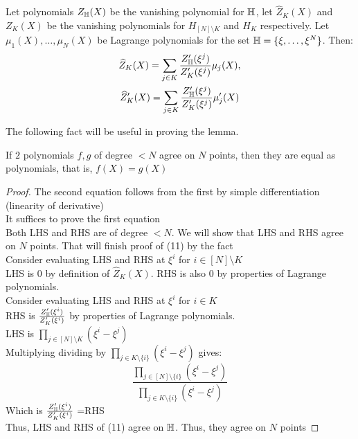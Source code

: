 \begin{lemma}\label{lem:zk-hat}
Let polynomials $Z_{\mathbb{H}}(X)$ be the vanishing polynomial for $\mathbb{H}$, let $\widehat{Z}_K(X)$ and $Z_K(X)$ be the vanishing polynomials for $H_{[N]\setminus K}$ and $H_K$ respectively. Let $\mu_1(X),\ldots,\mu_N(X)$
be Lagrange polynomials for the set $\mathbb{H}=\{\xi,\ldots,\xi^N\}$. Then:
\begin{gather}
    \widehat{Z}_K(X) = \sum_{j\in K}\frac{Z_{\mathbb{H}}'(\xi^j)}{Z_K'(\xi^j)}\mu_j(X), \\
    \widehat{Z}_K'(X)= \sum_{j\in K}\frac{Z_{\mathbb{H}}'(\xi^j)}{Z_K'(\xi^j)}\mu_j'(X)
\end{gather}
\end{lemma}
The following fact will be useful in proving the lemma.
\begin{fact}
    If $2$ polynomials $f,g$ of degree $<N$ agree on $N$ points, then they are equal as polynomials, that is, $f(X)=g(X)$
\end{fact}

\begin{proof}
    The second equation follows from the first by simple differentiation (linearity of derivative)\\
    It suffices to prove the first equation\\
    Both LHS and RHS are of degree $<N$. We will show that LHS and RHS agree on $N$ points. That will finish proof of (11) by the fact\\
    Consider evaluating LHS and RHS at $\xi^i$ for $i \in [N]\setminus K$ \\
    LHS is 0 by definition of $\hat{Z}_K(X)$. RHS is also 0 by properties of Lagrange polynomials.\\
    Consider evaluating LHS and RHS at $\xi^i$ for $i \in K$\\
    RHS is $\frac{Z_{\mathbb{H}}'(\xi^i)}{Z_K'(\xi^i)}$ by properties of Lagrange polynomials.\\
    LHS is $\prod_{j \in [N]\setminus K} (\xi^i-\xi^j)$\\
    Multiplying dividing by $\prod_{ j \in K \setminus \{i\}}(\xi^i-\xi^j)$ gives:
    $$\frac{\prod_{j \in [N] \setminus \{i\}} (\xi^i-\xi^j)}{\prod_{j \in K \setminus \{i\}}(\xi^i-\xi^j)}$$
    Which is $\frac{Z_{\mathbb{H}}'(\xi^i)}{Z_K'(\xi^i)}$ =RHS\\
    Thus, LHS and RHS of (11) agree on $\mathbb{H}$. Thus, they agree on $N$ points
\end{proof}

